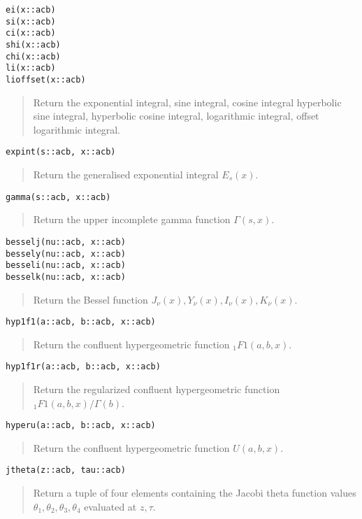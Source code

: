\documentclass[a4paper,10pt]{article}
\newcommand{\desc}[1]{\vspace{-3mm}\begin{quote}#1\end{quote}}
\begin{document}
{{\begin{lstlisting}
ei(x::acb)
si(x::acb)
ci(x::acb)
shi(x::acb)
chi(x::acb)
li(x::acb)
lioffset(x::acb)
\end{lstlisting}

\desc{Return the exponential integral, sine integral, cosine integral
hyperbolic sine integral, hyperbolic cosine integral, logarithmic integral,
offset logarithmic integral.}

\begin{lstlisting}
expint(s::acb, x::acb)
\end{lstlisting}

\desc{Return the generalised exponential integral $E_s(x)$.}

\begin{lstlisting}
gamma(s::acb, x::acb)
\end{lstlisting}

\desc{Return the upper incomplete gamma function $\Gamma(s,x)$.}

\begin{lstlisting}
besselj(nu::acb, x::acb)
bessely(nu::acb, x::acb)
besseli(nu::acb, x::acb)
besselk(nu::acb, x::acb)
\end{lstlisting}

\desc{Return the Bessel function $J_{\nu}(x), Y_{\nu}(x), I_{\nu}(x), K_{\nu}(x)$.}

\begin{lstlisting}
hyp1f1(a::acb, b::acb, x::acb)
\end{lstlisting}

\desc{Return the confluent hypergeometric function ${}_1F1(a,b,x)$.}

\begin{lstlisting}
hyp1f1r(a::acb, b::acb, x::acb)
\end{lstlisting}

\desc{Return the regularized confluent hypergeometric function ${}_1F1(a,b,x) / \Gamma(b)$.}

\begin{lstlisting}
hyperu(a::acb, b::acb, x::acb)
\end{lstlisting}

\desc{Return the confluent hypergeometric function $U(a,b,x)$.}

\begin{lstlisting}
jtheta(z::acb, tau::acb)
\end{lstlisting}

\desc{Return a tuple of four elements containing the Jacobi theta function
values $\theta_1, \theta_2, \theta_3, \theta_4$ evaluated at $z, \tau$.}

}}
\end{document}
